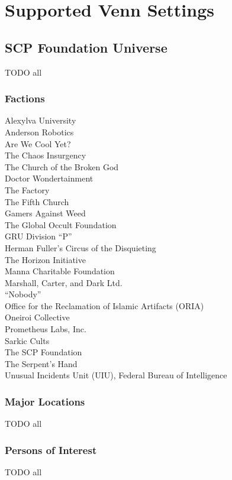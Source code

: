 \documentclass[letterpaper,titlepage,openany,twocolumn]{book}
\begin{document}
\part{Supported Venn Settings}

\chapter{SCP Foundation Universe}
TODO all\\

\section{Factions}
	Alexylva University\\
	Anderson Robotics\\
	Are We Cool Yet?\\
	The Chaos Insurgency\\
	The Church of the Broken God\\
	Doctor Wondertainment\\
	The Factory\\
	The Fifth Church\\
	Gamers Against Weed\\
	The Global Occult Foundation\\
	GRU Division “P”\\
	Herman Fuller’s Circus of the Disquieting\\
	The Horizon Initiative\\
	Manna Charitable Foundation\\
	Marshall, Carter, and Dark Ltd.\\
	“Nobody”\\
	Office for the Reclamation of Islamic Artifacts (ORIA)\\
	Oneiroi Collective\\
	Prometheus Labs, Inc.\\
	Sarkic Cults\\
	The SCP Foundation\\
	The Serpent’s Hand\\
	Unusual Incidents Unit (UIU), Federal Bureau of Intelligence\\

\section{Major Locations}
TODO all\\

\section{Persons of Interest}
TODO all\\
\end{document}

